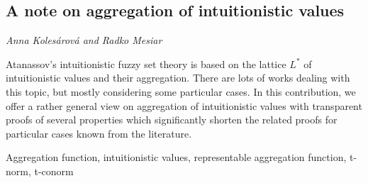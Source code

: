 \documentclass[../booklet.tex]{subfiles}
\begin{document}
\subsection[A note on aggregation of intuitionistic values. {\it Anna Kolesárová and Radko Mesiar}]{A note on aggregation of intuitionistic values}
 

\begin{center}
  {\it Anna Kolesárová and Radko Mesiar}
\end{center}


 Atanassov's intuitionistic fuzzy set theory is based on the lattice $L^*$ of intuitionistic values and their aggregation. There are lots of
works dealing with this topic, but mostly considering some particular cases. In this contribution, we offer  a rather general view on aggregation of intuitionistic values with transparent proofs of several properties which significantly shorten the related proofs for particular cases known from the literature.


\noindent
\smallskip
{} Aggregation function, intuitionistic values, representable aggregation function, t-norm, t-conorm
\end{document}
